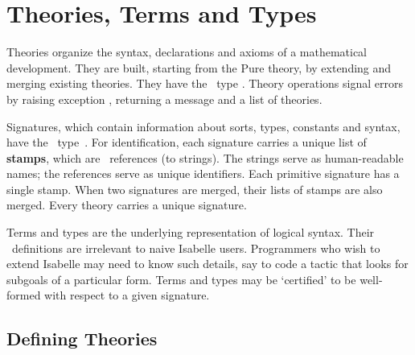
\chapter{Theories, Terms and Types} \label{theories}
Theories organize the syntax, declarations and axioms of a mathematical
development.  They are built, starting from the Pure theory, by extending
and merging existing theories.  They have the \ML\ type .
Theory operations signal errors by raising exception ,
returning a message and a list of theories.

Signatures, which contain information about sorts, types, constants and
syntax, have the \ML\ type~.  For identification,
each signature carries a unique list of {\bf stamps}, which are \ML\
references (to strings).  The strings serve as human-readable names; the
references serve as unique identifiers.  Each primitive signature has a
single stamp.  When two signatures are merged, their lists of stamps are
also merged.  Every theory carries a unique signature.

Terms and types are the underlying representation of logical syntax.  Their
\ML\ definitions are irrelevant to naive Isabelle users.  Programmers who
wish to extend Isabelle may need to know such details, say to code a tactic
that looks for subgoals of a particular form.  Terms and types may be
`certified' to be well-formed with respect to a given signature.

\section{Defining Theories}\label{DefiningTheories}

